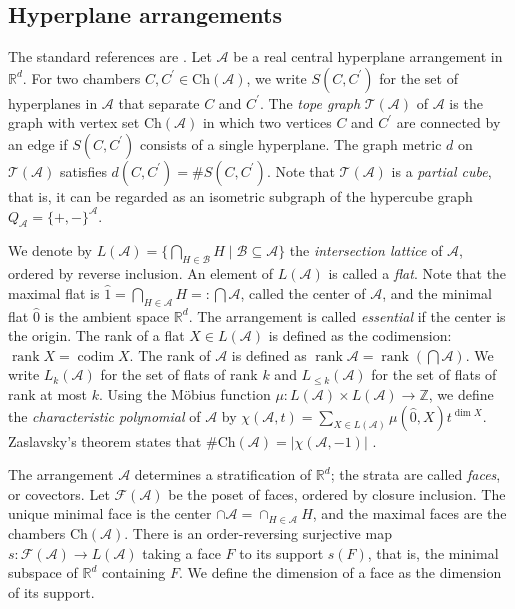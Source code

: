 \documentclass{amsart}
\numberwithin{equation}{section}
\theoremstyle{plain}
\theoremstyle{remark}
\theoremstyle{definition}
\numberwithin{equation}{section}
\newcommand{\A}{\mathcal{A}}
\newcommand{\T}{\mathcal{T}}
\newcommand{\FF}{\mathcal{F}}
\newcommand{\R}{\mathbb{R}}
\newcommand{\Z}{\mathbb{Z}}
\newcommand{\Ch}{\mathrm{Ch}}
\DeclareMathOperator{\rank}{rank}
\DeclareMathOperator{\codim}{codim}
\begin{document}
\subsection{Hyperplane arrangements}
The standard references are \cite{Orlik1992,Stanley2007}. Let $\A$ be a real central hyperplane arrangement in $\R^d$.
For two chambers $C,C^{\prime}\in\Ch(\A)$, we write $S(C,C^{\prime})$ for the set of hyperplanes in $\A$ that separate $C$ and $C^{\prime}$.
The \emph{tope graph} $\T(\A)$ of $\A$ is the graph with vertex set $\Ch(\A)$ in which two vertices $C$ and $C^{\prime}$ are connected by an edge if $S(C,C^{\prime})$ consists of a single hyperplane. 
The graph metric $d$ on $\T(\A)$ satisfies $d(C,C^{\prime})=\#S(C,C^{\prime})$. 
Note that $\T(\A)$ is a \emph{partial cube}, that is, it can be regarded as an isometric subgraph of the hypercube graph $Q_{\A}=\{+,-\}^{\A}$.


We denote by $L(\A)=\{\bigcap_{H\in\mathcal{B}}H\mid \mathcal{B}\subseteq \A\}$ the \emph{intersection lattice} of $\A$, ordered by reverse inclusion. An element of $L(\A)$ is called a \emph{flat}. Note that the maximal flat is $\hat{1}=\bigcap_{H\in\A}H=:\bigcap\A$, called the center of $\A$, and the minimal flat $\hat{0}$ is the ambient space $\R^d$. The arrangement is called \emph{essential} if the center is the origin. The rank of a flat $X\in L(\A)$ is defined as the codimension: $\rank X=\codim X$. The rank of $\A$ is defined as $\rank \A=\rank (\bigcap\A)$. We write $L_k(\A)$ for the set of flats of rank $k$ and $L_{\leq k}(\A)$ for the set of flats of rank at most $k$. Using the M\"obius function $\mu:L(\A)\times L(\A)\to\Z$, we define the \emph{characteristic polynomial} of $\A$ by $\chi(\A,t)=\sum_{X\in L(\A)}\mu(\hat{0},X)t^{\dim X}$. Zaslavsky's theorem states that $\#\Ch(\A)=|\chi(\A,-1)|$ \cite{Zaslavsky1975}.

The arrangement $\A$ determines a stratification of $\R^d$; the strata are called \emph{faces}, or covectors. Let $\FF(\A)$ be the poset of faces, ordered by closure inclusion. The unique minimal face is the center $\cap\A=\cap_{H\in\A}H$, and the maximal faces are the chambers $\Ch(\A)$. There is an order-reversing surjective map $s:\FF(\A)\to L(\A)$ taking a face $F$ to its support $s(F)$, that is, the minimal subspace of $\R^d$ containing $F$. We define the dimension of a face as the dimension of its support.
\end{document}
